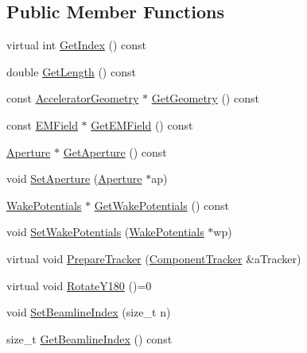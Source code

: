 \subsection*{Public Member Functions}
\begin{DoxyCompactItemize}
\item 
virtual int \hyperlink{classAcceleratorComponent_abd1490171ac9af6004d3da01fb3b95fb}{Get\+Index} () const
\item 
double \hyperlink{classAcceleratorComponent_a2922c29d1002d92dc6ecad4a64e5f61e}{Get\+Length} () const
\item 
const \hyperlink{classAcceleratorGeometry}{Accelerator\+Geometry} $\ast$ \hyperlink{classAcceleratorComponent_ac75cb2f0dca9d9ccd2d824a0686bb348}{Get\+Geometry} () const
\item 
const \hyperlink{classEMField}{E\+M\+Field} $\ast$ \hyperlink{classAcceleratorComponent_ae9b86c05ea3b351d5e69683db6cde3b6}{Get\+E\+M\+Field} () const
\item 
\hyperlink{classAperture}{Aperture} $\ast$ \hyperlink{classAcceleratorComponent_aad8b580f5a871205af01c42b6090518f}{Get\+Aperture} () const
\item 
void \hyperlink{classAcceleratorComponent_a5f1b3a0d7bb1b97730f7d7f1e2c968b0}{Set\+Aperture} (\hyperlink{classAperture}{Aperture} $\ast$ap)
\item 
\hyperlink{classWakePotentials}{Wake\+Potentials} $\ast$ \hyperlink{classAcceleratorComponent_a167e52a18f62c9ceffd62ed0c3c079cd}{Get\+Wake\+Potentials} () const
\item 
void \hyperlink{classAcceleratorComponent_a9f9eb01e2e118e1d1f639bbedf0b45ae}{Set\+Wake\+Potentials} (\hyperlink{classWakePotentials}{Wake\+Potentials} $\ast$wp)
\item 
virtual void \hyperlink{classAcceleratorComponent_ab897c54689ac946f40c3ad0716ddd4bb}{Prepare\+Tracker} (\hyperlink{classComponentTracker}{Component\+Tracker} \&a\+Tracker)
\item 
virtual void \hyperlink{classAcceleratorComponent_a8bf0d39b56578ca99f286ca1504b9072}{Rotate\+Y180} ()=0
\item 
void \hyperlink{classAcceleratorComponent_ad3014eb3d45b9991fbd6e4a01137355d}{Set\+Beamline\+Index} (size\+\_\+t n)
\item 
size\+\_\+t \hyperlink{classAcceleratorComponent_a89496aa0510c3227cb3599beaf4967cb}{Get\+Beamline\+Index} () const
\item 
\mbox{\label{classAcceleratorComponent_aa69f283744b32db0cff9add563d20a38}} 

\end{DoxyCompactItemize}
